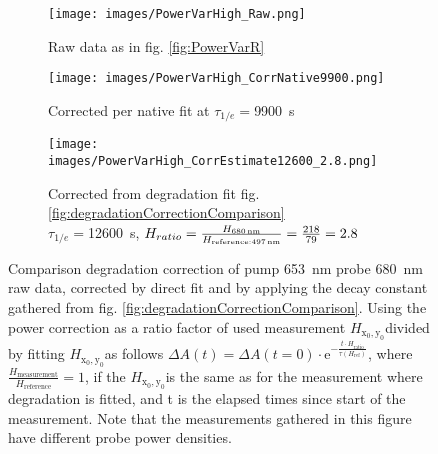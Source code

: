 \documentclass[twoside,openright,listof=numbered]{scrreprt}
\def\radiantExp{\ensuremath{H_\mathrm{x_0,y_0}}}
\begin{document}
\begin{figure}[hbtp]
\centering
\begin{subfigure}[t]{0.3215\linewidth}
\centering
\texttt{[image: images/PowerVarHigh\_Raw.png]}
\caption{Raw data as in fig. \ref{fig:PowerVarR}}
\end{subfigure}
\hfill
\begin{subfigure}[t]{0.3215\linewidth}
\centering
\texttt{[image: images/PowerVarHigh\_CorrNative9900.png]} 
\caption{Corrected per native fit at $\tau_{1/e}=$\SI{9900}{\second}}
\end{subfigure}
\hfill
\begin{subfigure}[t]{0.3215\linewidth}
\centering
\texttt{[image: images/PowerVarHigh\_CorrEstimate12600\_2.8.png]} 
\caption{Corrected from degradation fit fig. \ref{fig:degradationCorrectionComparison}\\
$\tau_{1/e}=$\SI{12600}{\second}, $H_{ratio}=\frac{H_\text{\SI{680}{\nano\meter}}}{H_\text{reference:\SI{497}{\nano\meter}}} = \frac{218}{79}= 2.8$}
\end{subfigure}
\caption[Comparison of degradation correction of pump \SI{653}{\nano\meter} probe \SI{680}{\nano\meter} data. Degradation corrected by directly fitted and adapted, power corrected, decay constant.]{Comparison degradation correction of pump \SI{653}{\nano\meter} probe \SI{680}{\nano\meter} raw data, corrected by direct fit and by applying the decay constant gathered from fig. \ref{fig:degradationCorrectionComparison}. Using the power correction as a ratio factor of used measurement \radiantExp divided by fitting \radiantExp as follows $\Delta A(t) = \Delta A(t=0)\cdot \mathrm{e}^{-\frac{t\cdot H_\text{ratio}}{\tau\left(H_\text{ref}\right)}}$, where $\frac{H_\mathrm{measurement}}{H_\mathrm{reference}} =1$, if the \radiantExp is the same as for the measurement where degradation is fitted, and t is the elapsed times since start of the measurement. Note that the measurements gathered in this figure have different probe power densities.\label{fig:powerVarCorrection}}
\end{figure}
\end{document}
